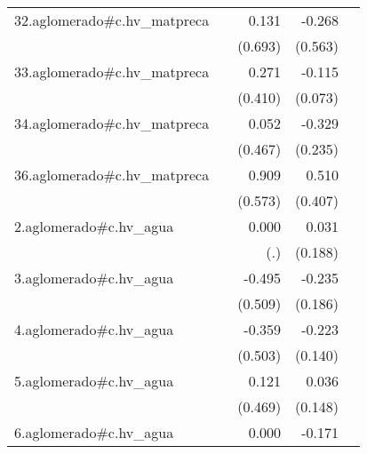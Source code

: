 {\begin{longtable}{l*{4}{D{.}{.}{-1}}}
\addlinespace
32.aglomerado#c.hv\_matpreca&                     &       0.131         &      -0.268         &                     \\
            &                     &     (0.693)         &     (0.563)         &                     \\
\addlinespace
33.aglomerado#c.hv\_matpreca&                     &       0.271         &      -0.115         &                     \\
            &                     &     (0.410)         &     (0.073)         &                     \\
\addlinespace
34.aglomerado#c.hv\_matpreca&                     &       0.052         &      -0.329         &                     \\
            &                     &     (0.467)         &     (0.235)         &                     \\
\addlinespace
36.aglomerado#c.hv\_matpreca&                     &       0.909         &       0.510         &                     \\
            &                     &     (0.573)         &     (0.407)         &                     \\
\addlinespace
2.aglomerado#c.hv\_agua&                     &       0.000         &       0.031         &                     \\
            &                     &         (.)         &     (0.188)         &                     \\
\addlinespace
3.aglomerado#c.hv\_agua&                     &      -0.495         &      -0.235         &                     \\
            &                     &     (0.509)         &     (0.186)         &                     \\
\addlinespace
4.aglomerado#c.hv\_agua&                     &      -0.359         &      -0.223         &                     \\
            &                     &     (0.503)         &     (0.140)         &                     \\
\addlinespace
5.aglomerado#c.hv\_agua&                     &       0.121         &       0.036         &                     \\
            &                     &     (0.469)         &     (0.148)         &                     \\
\addlinespace
6.aglomerado#c.hv\_agua&                     &       0.000         &      -0.171         &                     \\

\end{longtable}}
